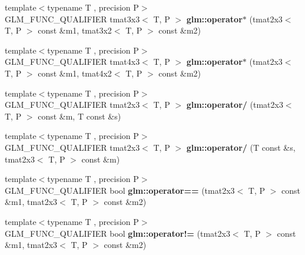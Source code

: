 \begin{DoxyCompactItemize}
\item 
\hypertarget{namespaceglm_ad6e371f1de55e754fdde27898d29c377}{{\footnotesize template$<$typename T , precision P$>$ }\\G\-L\-M\-\_\-\-F\-U\-N\-C\-\_\-\-Q\-U\-A\-L\-I\-F\-I\-E\-R tmat3x3$<$ T, P $>$ {\bfseries glm\-::operator$\ast$} (tmat2x3$<$ T, P $>$ const \&m1, tmat3x2$<$ T, P $>$ const \&m2)}\label{namespaceglm_ad6e371f1de55e754fdde27898d29c377}

\item 
\hypertarget{namespaceglm_ad6fbbb47791ef5cf25d6e85478b0ac07}{{\footnotesize template$<$typename T , precision P$>$ }\\G\-L\-M\-\_\-\-F\-U\-N\-C\-\_\-\-Q\-U\-A\-L\-I\-F\-I\-E\-R tmat4x3$<$ T, P $>$ {\bfseries glm\-::operator$\ast$} (tmat2x3$<$ T, P $>$ const \&m1, tmat4x2$<$ T, P $>$ const \&m2)}\label{namespaceglm_ad6fbbb47791ef5cf25d6e85478b0ac07}

\item 
\hypertarget{namespaceglm_a7bd8e96d855416d5a0bb2ee8933720d9}{{\footnotesize template$<$typename T , precision P$>$ }\\G\-L\-M\-\_\-\-F\-U\-N\-C\-\_\-\-Q\-U\-A\-L\-I\-F\-I\-E\-R tmat2x3$<$ T, P $>$ {\bfseries glm\-::operator/} (tmat2x3$<$ T, P $>$ const \&m, T const \&s)}\label{namespaceglm_a7bd8e96d855416d5a0bb2ee8933720d9}

\item 
\hypertarget{namespaceglm_a7f733aa2965f6acb67a211a5cd8dd2d0}{{\footnotesize template$<$typename T , precision P$>$ }\\G\-L\-M\-\_\-\-F\-U\-N\-C\-\_\-\-Q\-U\-A\-L\-I\-F\-I\-E\-R tmat2x3$<$ T, P $>$ {\bfseries glm\-::operator/} (T const \&s, tmat2x3$<$ T, P $>$ const \&m)}\label{namespaceglm_a7f733aa2965f6acb67a211a5cd8dd2d0}

\item 
\hypertarget{namespaceglm_ac912517a461de497022d75ec4de3dba5}{{\footnotesize template$<$typename T , precision P$>$ }\\G\-L\-M\-\_\-\-F\-U\-N\-C\-\_\-\-Q\-U\-A\-L\-I\-F\-I\-E\-R bool {\bfseries glm\-::operator==} (tmat2x3$<$ T, P $>$ const \&m1, tmat2x3$<$ T, P $>$ const \&m2)}\label{namespaceglm_ac912517a461de497022d75ec4de3dba5}

\item 
\hypertarget{namespaceglm_aa83d47e20bf01d8d4009de4d5440c457}{{\footnotesize template$<$typename T , precision P$>$ }\\G\-L\-M\-\_\-\-F\-U\-N\-C\-\_\-\-Q\-U\-A\-L\-I\-F\-I\-E\-R bool {\bfseries glm\-::operator!=} (tmat2x3$<$ T, P $>$ const \&m1, tmat2x3$<$ T, P $>$ const \&m2)}\label{namespaceglm_aa83d47e20bf01d8d4009de4d5440c457}

\end{DoxyCompactItemize}


